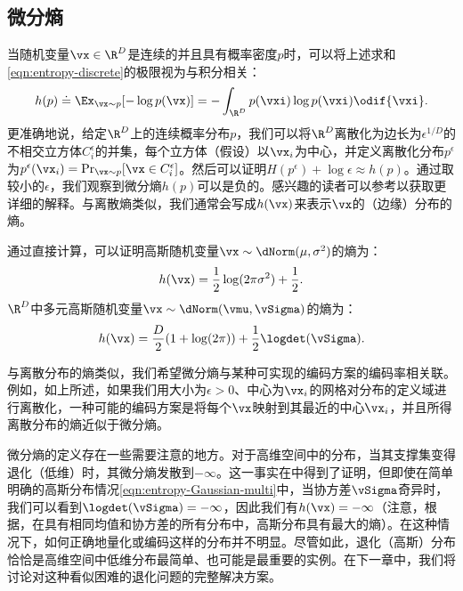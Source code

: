 \documentclass[../../book-main_zh.tex]{subfiles}
\begin{document}
\subsection{微分熵}

当随机变量\(\vx \in \R^{D}\)是连续的并且具有概率密度\(p\)时，可以将上述求和\eqref{eqn:entropy-discrete}的极限视为与积分相关：
\begin{equation}
    h(p) \doteq \Ex_{\vx \sim p}[-\log p(\vx)] = - \int_{\R^{D}}
    p(\vxi) \log p(\vxi) \odif{\vxi}.
    \label{eqn:entropy-differential}
\end{equation}
更准确地说，给定\(\R^{D}\)上的连续概率分布\(p\)，我们可以将\(\R^{D}\)离散化为边长为\(\epsilon^{1/D}\)的不相交立方体\(C_{i}^{\epsilon}\)的并集，每个立方体（假设）以\(\vx_{i}\)为中心，并定义离散化分布\(p^{\epsilon}\)为\(p^{\epsilon}(\vx_{i}) = \Pr_{\vx \sim p}[\vx
\in C_{i}^{\epsilon}]\)。然后可以证明\(H(p^{\epsilon}) +
\log \epsilon \approx h(p)\)。通过取较小的\(\epsilon\)，我们观察到微分熵\(h(p)\)可以是负的。感兴趣的读者可以参考\cite{Cover-Thomas}以获取更详细的解释。与离散熵类似，我们通常会写成\(h(\vx)\)来表示\(\vx\)的（边缘）分布的熵。

\begin{example}[高斯分布的熵]
    通过直接计算，可以证明高斯随机变量\(\vx \sim \dNorm(\mu, \sigma^{2})\)的熵为：
    \begin{equation}
        h(\vx) = \frac{1}{2}\log (2\pi
        \sigma^{2}) + \frac{1}{2}.
        \label{eqn:entropy-Gaussian}
    \end{equation}
    \(\R^{D}\)中多元高斯随机变量\(\vx \sim
    \dNorm(\vmu, \vSigma)\)的熵为：
    \begin{equation}
        h(\vx) = \frac{D}{2}(1 + \log(2\pi)) +
        \frac{1}{2}\logdet(\vSigma).
        \label{eqn:entropy-Gaussian-multi}
    \end{equation}
\end{example}

与离散分布的熵类似，我们希望微分熵与某种可实现的编码方案的编码率相关联。例如，如上所述，如果我们用大小为\(\epsilon > 0\)、中心为\(\vx_{i}\)的网格对分布的定义域进行离散化，一种可能的编码方案是将每个\(\vx\)映射到其最近的中心\(\vx_{i}\)，并且所得离散分布的熵近似于微分熵\cite{Cover-Thomas}。

微分熵的定义存在一些需要注意的地方。对于高维空间中的分布，当其支撑集变得退化（低维）时，其微分熵发散到\(-\infty\)。这一事实在中得到了证明，但即使在简单明确的高斯分布情况\eqref{eqn:entropy-Gaussian-multi}中，当协方差\(\vSigma\)奇异时，我们可以看到\(\logdet(\vSigma) = -\infty\)，因此我们有\(h(\vx) = -\infty\)（注意，根据，在具有相同均值和协方差的所有分布中，高斯分布具有最大的熵）。在这种情况下，如何正确地量化或编码这样的分布并不明显。尽管如此，退化（高斯）分布恰恰是高维空间中低维分布最简单、也可能是最重要的实例。在下一章中，我们将讨论对这种看似困难的退化问题的完整解决方案。
\end{document}
